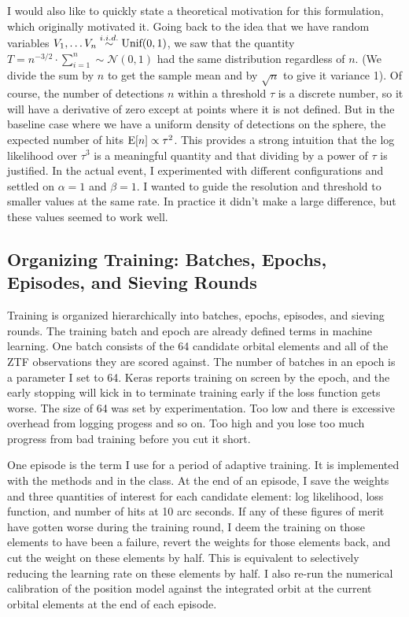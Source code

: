 I would also like to quickly state a theoretical motivation for this formulation, which originally motivated it.
Going back to the idea that we have random variables $V_1, \ldots V_n \overset{i.i.d.}{\sim} \textnormal{Unif}(0, 1)$,
we saw that the quantity $T = n^{-3/2} \cdot \sum_{i=1}^{n} \sim \mathcal{N}(0,1)$ had the same distribution regardless of $n$.
(We divide the sum by $n$ to get the sample mean and by $\sqrt{n}$ to give it variance 1).
Of course, the number of detections $n$ within a threshold $\tau$ is a discrete number, 
so it will have a derivative of zero except at points where it is not defined.
But in the baseline case where we have a uniform density of detections on the sphere,
the expected number of hits $\mathrm{E}[n] \propto \tau^2$.
This provides a strong intuition that the log likelihood over $\tau^3$ is a meaningful quantity
and that dividing by a power of $\tau$ is justified.
In the actual event, I experimented with different configurations and settled on $\alpha=1$ and $\beta=1$.
I wanted to guide the resolution and threshold to smaller values at the same rate.
In practice it didn't make a large difference, but these values seemed to work well.

\subsection{Organizing Training: Batches, Epochs, Episodes, and Sieving Rounds}
Training is organized hierarchically into batches, epochs, episodes, and sieving rounds.
The training batch and epoch are already defined terms in machine learning.
One batch consists of the 64 candidate orbital elements and all of the ZTF observations they are scored against.
The number of batches in an epoch is a parameter I set to 64.
Keras reports training on screen by the epoch, 
and the early stopping will kick in to terminate training early if the loss function gets worse.
The size of 64 was set by experimentation.
Too low and there is excessive overhead from logging progess and so on.
Too high and you lose too much progress from bad training before you cut it short.

One episode is the term I use for a period of adaptive training.
It is implemented with the methods  and  in the  class.
At the end of an episode, I save the weights and three quantities of interest for each candidate element:
log likelihood, loss function, and number of hits at 10 arc seconds.
If any of these figures of merit have gotten worse during the training round,
I deem the training on those elements to have been a failure, revert the weights for those elements back, and cut the weight on these elements by half.
This is equivalent to selectively reducing the learning rate on these elements by half.
I also re-run the numerical calibration of the position model against the  integrated orbit at the current orbital elements at the end of each episode.

